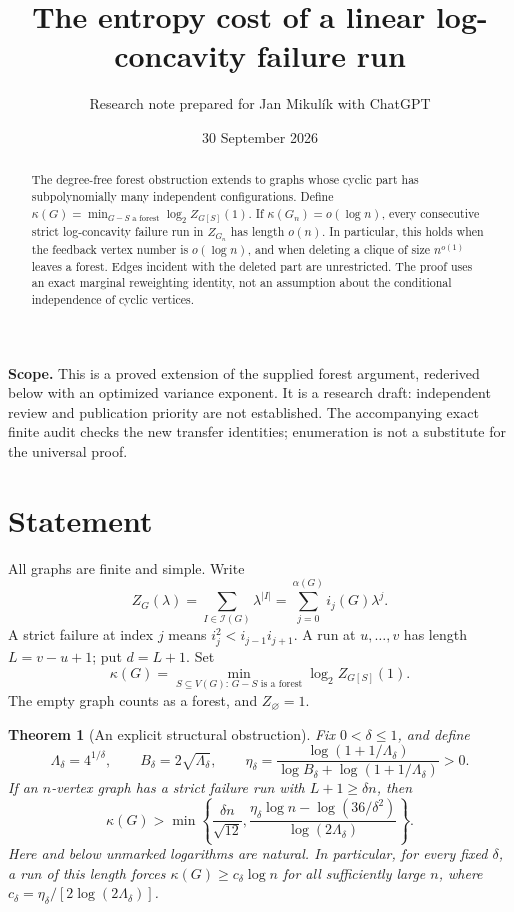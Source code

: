 \documentclass[10pt]{article}
\title{The entropy cost of a linear log-concavity failure run}
\author{Research note prepared for Jan Mikul\'ik with ChatGPT}
\date{30 September 2026}
\newtheorem{theorem}{Theorem}
\newcommand{\IS}{\mathcal I}
\begin{document}
\maketitle
\begin{abstract}
The degree-free forest obstruction extends to graphs whose cyclic part has
subpolynomially many independent configurations. Define
\(\kappa(G)=\min_{G-S\text{ a forest}}\log_2 Z_{G[S]}(1)\).
If \(\kappa(G_n)=o(\log n)\), every consecutive strict log-concavity
failure run in \(Z_{G_n}\) has length \(o(n)\). In particular, this holds
when the feedback vertex number is \(o(\log n)\), and when deleting a clique
of size \(n^{o(1)}\) leaves a forest. Edges incident with the deleted part
are unrestricted. The proof uses an exact marginal reweighting identity,
not an assumption about the conditional independence of cyclic vertices.
\end{abstract}

\noindent\textbf{Scope.} This is a proved extension of the supplied forest
argument, rederived below with an optimized variance exponent. It is a
research draft: independent review and publication priority are not
established. The accompanying exact finite audit checks the new transfer
identities; enumeration is not a substitute for the universal proof.

\section{Statement}
All graphs are finite and simple. Write
\[
 Z_G(\lambda)=\sum_{I\in\IS(G)}\lambda^{|I|}
   =\sum_{j=0}^{\alpha(G)}i_j(G)\lambda^j.
\]
A strict failure at index \(j\) means
\(i_j^2<i_{j-1}i_{j+1}\). A run at \(u,\ldots,v\) has length
\(L=v-u+1\); put \(d=L+1\). Set
\[
 \kappa(G)=\min_{S\subseteq V(G):\,G-S\text{ is a forest}}
               \log_2 Z_{G[S]}(1).
\]
The empty graph counts as a forest, and \(Z_\varnothing=1\).

\begin{theorem}[An explicit structural obstruction]\label{thm:main}
Fix \(0<\delta\le1\), and define
\[
 \Lambda_\delta=4^{1/\delta},\qquad
 B_\delta=2\sqrt{\Lambda_\delta},\qquad
 \eta_\delta=
 \frac{\log(1+1/\Lambda_\delta)}
      {\log B_\delta+\log(1+1/\Lambda_\delta)} >0.
\]
If an \(n\)-vertex graph has a strict failure run with \(L+1\ge\delta n\),
then
\begin{equation}\label{eq:barrier}
\boxed{\quad
 \kappa(G)>
 \min\left\{\frac{\delta n}{\sqrt{12}},
 \frac{\eta_\delta\log n-\log(36/\delta^2)}
      {\log(2\Lambda_\delta)}\right\}.
 \quad}
\end{equation}
Here and below unmarked logarithms are natural. In particular, for every
fixed \(\delta\), a run of this length forces
\(\kappa(G)\ge c_\delta\log n\) for all sufficiently large \(n\), where
\(c_\delta=\eta_\delta/[2\log(2\Lambda_\delta)]\).
\end{theorem}
\end{document}
